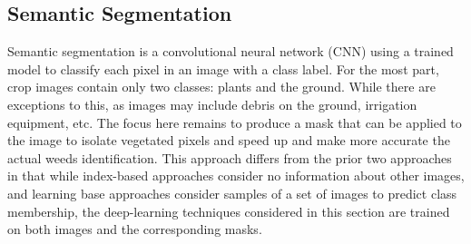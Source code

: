 \documentclass[letterpaper]{report}
\begin{document}
{%
%

\subsection{Semantic Segmentation}
Semantic segmentation is a convolutional neural network (\gls{CNN}) using a trained model to classify each pixel in an image with a class label.  For the most part, crop images contain only two classes: plants and the ground. While there are exceptions to this,  as images may include debris on the ground, irrigation equipment, etc.  The focus here remains to produce a mask that can be applied to the image to isolate vegetated pixels and speed up and make more accurate the actual weeds identification. This approach differs from the prior two approaches in that while index-based approaches consider no information about other images, and learning base approaches consider samples of a set of images to predict class membership, the deep-learning techniques considered in this section are trained on both images and the corresponding masks.

}
\end{document}
